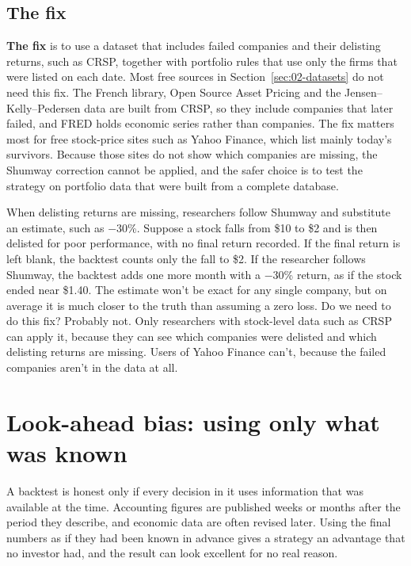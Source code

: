 \subsection{The fix}

\textbf{The fix} is to use a dataset that includes failed companies and their delisting returns, such as CRSP, together with portfolio rules that use only the firms that were listed on each date. 
Most free sources in Section~\ref{sec:02-datasets} do not need this fix. The French library, Open Source Asset Pricing and the Jensen--Kelly--Pedersen data are built from CRSP, so they include companies that later failed, and FRED holds economic series rather than companies. The fix matters most for free stock-price sites such as Yahoo Finance, which list mainly today's survivors. Because those sites do not show which companies are missing, the Shumway correction cannot be applied, and the safer choice is to test the strategy on portfolio data that were built from a complete database.

When delisting returns are missing, researchers follow Shumway and substitute an estimate, such as $-30$\%.
Suppose a stock falls from \$10 to \$2 and is then delisted for poor performance, with no final return recorded.
If the final return is left blank, the backtest counts only the fall to \$2.
If the researcher follows Shumway, the backtest adds one more month with a $-30$\% return, as if the stock ended near \$1.40.
The estimate won’t be exact for any single company, but on average it is much closer to the truth than assuming a zero loss.
Do we need to do this fix? Probably not. Only researchers with stock-level data such as CRSP can apply it, because they can see which companies were delisted and which delisting returns are missing. Users of Yahoo Finance can’t, because the failed companies aren’t in the data at all.


\section{Look-ahead bias: using only what was known}
\label{sec:02-lookahead}

A backtest is honest only if every decision in it uses information that was available at the time. Accounting figures are published weeks or months after the period they describe, and economic data are often revised later. Using the final numbers as if they had been known in advance gives a strategy an advantage that no investor had, and the result can look excellent for no real reason.

